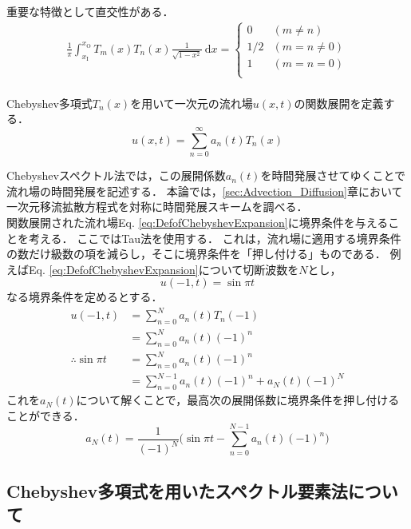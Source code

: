 \documentclass[12pt,a4paper]{jsarticle}
\begin{document}
重要な特徴として直交性がある．
\begin{align}
  \frac{1}{\pi} \int_{x_{\text{I}}}^{x_{\text{O}}} T_{m}(x) T_n{(x)} \frac{1}{\sqrt{1-x^2}} ~\mathrm{d}x =\left\{ \begin{array}{ll}
  0 &   (m \ne n) \\
  1/2 & (m = n \ne 0) \\
  1 &   (m = n = 0) \\
\end{array} \right.
\label{eq:OrthogonalofChebyshev}
\end{align}\\

Chebyshev多項式$T_{n}(x)$を用いて一次元の流れ場$u(x,t)$の関数展開を定義する．
\begin{equation}
  u(x,t) = \sum_{n=0}^{\infty} a_{n}(t) T_{n}(x)
\label{eq:DefofChebyshevExpansion}
\end{equation}

Chebyshevスペクトル法では，この展開係数$a_{n}(t)$を時間発展させてゆくことで流れ場の時間発展を記述する．
本論では，\ref{sec:Advection_Diffusion}章において一次元移流拡散方程式を対称に時間発展スキームを調べる．\\

関数展開された流れ場Eq. \ref{eq:DefofChebyshevExpansion}に境界条件を与えることを考える．
ここではTau法を使用する．
これは，流れ場に適用する境界条件の数だけ級数の項を減らし，そこに境界条件を「押し付ける」ものである．
例えばEq. \ref{eq:DefofChebyshevExpansion}について切断波数を$N$とし，
\begin{equation}
  u(-1,t) = \sin \pi t
\label{eq:BCofChebyshevExpansion}
\end{equation}
なる境界条件を定めるとする．
\begin{align*}
  u(-1,t) &= \sum_{n=0}^{N} a_{n}(t) T_{n}(-1) \\
          &= \sum_{n=0}^{N} a_{n}(t) (-1)^n \\
  \therefore \sin \pi t
    &= \sum_{n=0}^{N} a_{n}(t) (-1)^n \\
    &= \sum_{n=0}^{N-1} a_{n}(t) (-1)^n +a_{N}(t) (-1)^N
\end{align*}
これを$a_{N}(t)$について解くことで，最高次の展開係数に境界条件を押し付けることができる．
\begin{equation}
  a_{N}(t) = \frac{1}{(-1)^N} \Big( \sin \pi t -\sum_{n=0}^{N-1} a_{n}(t) (-1)^n \Big)
  \label{eq:BCofChebyshevExample}
\end{equation}


\subsection{Chebyshev多項式を用いたスペクトル要素法について}
\label{subsec:ChebyshevSpectralElementMehod}
\end{document}
